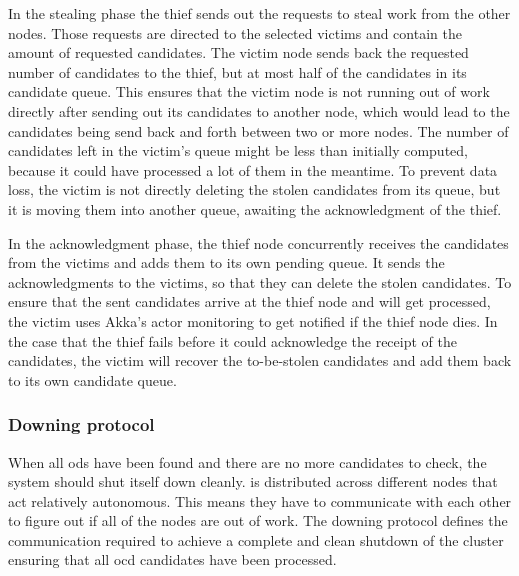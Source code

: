   In the stealing phase the thief sends out the requests to steal work from the other nodes.
  Those requests are directed to the selected victims and contain the amount of requested candidates.
  The victim node sends back the requested number of candidates to the thief, but at most half of the candidates in its candidate queue.
  This ensures that the victim node is not running out of work directly after sending out its candidates to another node, which would lead to the candidates being send back and forth between two or more nodes.
  The number of candidates left in the victim's queue might be less than initially computed, because it could have processed a lot of them in the meantime.
  To prevent data loss, the victim is not directly deleting the stolen candidates from its queue, but it is moving them into another queue, awaiting the acknowledgment of the thief.

  In the acknowledgment phase, the thief node concurrently receives the candidates from the victims and adds them to its own pending queue.
  It sends the acknowledgments to the victims, so that they can delete the stolen candidates.
  To ensure that the sent candidates arrive at the thief node and will get processed, the victim uses Akka's actor monitoring to get notified if the thief node dies.
  In the case that the thief fails before it could acknowledge the receipt of the candidates, the victim will recover the to-be-stolen candidates and add them back to its own candidate queue.

\subsubsection{Downing protocol}\label{protocol:downing}

  When all \glspl{od} have been found and there are no more candidates to check, the system should shut itself down cleanly.
  \dodo{} is distributed across different nodes that act relatively autonomous.
  This means they have to communicate with each other to figure out if all of the nodes are out of work.
  The downing protocol defines the communication required to achieve a complete and clean shutdown of the cluster ensuring that all \gls{ocd} candidates have been processed.

